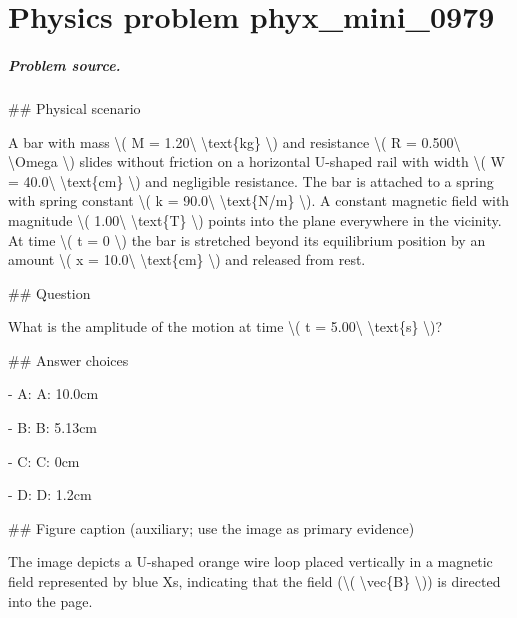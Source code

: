 
\chapter{Physics problem phyx\_mini\_0979}
\label{ch:PhyXMiniProblems_problem_phyx_mini_0979}

\paragraph{Problem source.}
\#\# Physical scenario

A bar with mass \textbackslash{}( M = 1.20\textbackslash{} \textbackslash{}text\{kg\} \textbackslash{}) and resistance \textbackslash{}( R = 0.500\textbackslash{} \textbackslash{}Omega \textbackslash{}) slides without friction on a horizontal U-shaped rail with width \textbackslash{}( W = 40.0\textbackslash{} \textbackslash{}text\{cm\} \textbackslash{}) and negligible resistance. The bar is attached to a spring with spring constant \textbackslash{}( k = 90.0\textbackslash{} \textbackslash{}text\{N/m\} \textbackslash{}). A constant magnetic field with magnitude \textbackslash{}( 1.00\textbackslash{} \textbackslash{}text\{T\} \textbackslash{}) points into the plane everywhere in the vicinity. At time \textbackslash{}( t = 0 \textbackslash{}) the bar is stretched beyond its equilibrium position by an amount \textbackslash{}( x = 10.0\textbackslash{} \textbackslash{}text\{cm\} \textbackslash{}) and released from rest.

\#\# Question

What is the amplitude of the motion at time \textbackslash{}( t = 5.00\textbackslash{} \textbackslash{}text\{s\} \textbackslash{})?

\#\# Answer choices

- A: A: 10.0cm

- B: B: 5.13cm

- C: C: 0cm

- D: D: 1.2cm

\#\# Figure caption (auxiliary; use the image as primary evidence)

The image depicts a U-shaped orange wire loop placed vertically in a magnetic field represented by blue Xs, indicating that the field (\textbackslash{}( \textbackslash{}vec\{B\} \textbackslash{})) is directed into the page. 

